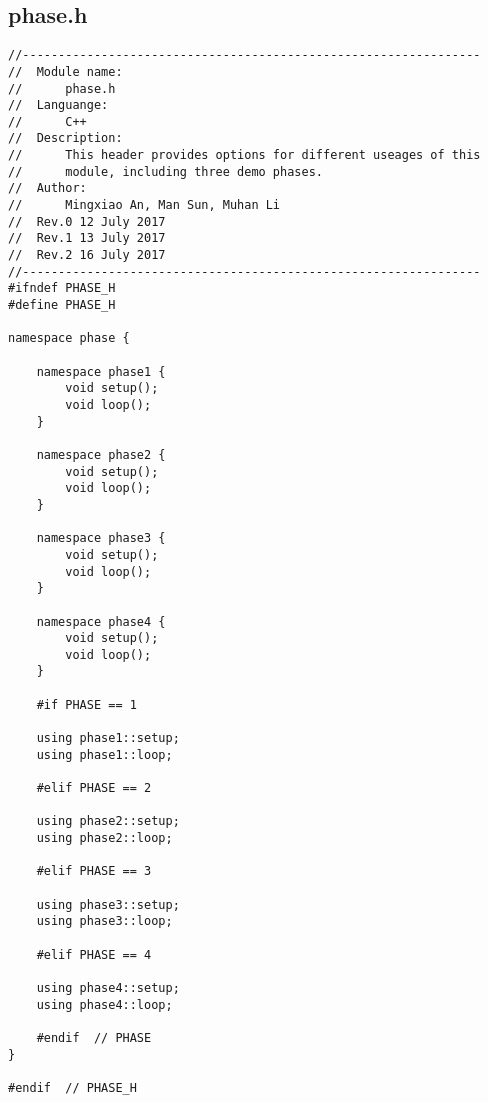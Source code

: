 \subsection{phase.h}
\begin{verbatim}
//----------------------------------------------------------------
//  Module name:
//      phase.h
//  Languange:
//      C++
//  Description:
//      This header provides options for different useages of this 
//      module, including three demo phases.
//  Author:
//      Mingxiao An, Man Sun, Muhan Li
//  Rev.0 12 July 2017
//  Rev.1 13 July 2017
//  Rev.2 16 July 2017
//----------------------------------------------------------------
#ifndef PHASE_H
#define PHASE_H

namespace phase {

    namespace phase1 {
        void setup();
        void loop();
    }

    namespace phase2 {
        void setup();
        void loop();
    }

    namespace phase3 {
        void setup();
        void loop();
    }

    namespace phase4 {
        void setup();
        void loop();
    }

    #if PHASE == 1

    using phase1::setup;
    using phase1::loop;

    #elif PHASE == 2

    using phase2::setup;
    using phase2::loop;

    #elif PHASE == 3

    using phase3::setup;
    using phase3::loop;

    #elif PHASE == 4

    using phase4::setup;
    using phase4::loop;

    #endif  // PHASE
}

#endif  // PHASE_H

\end{verbatim}

